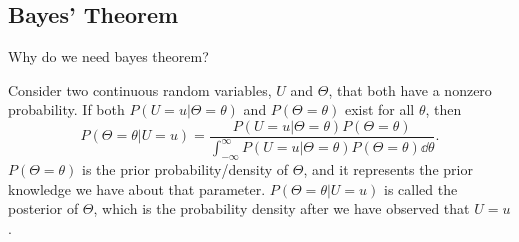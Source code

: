 \subsection{Bayes' Theorem}
Why do we need bayes theorem?

\begin{comment}
Consider two events, $A$ and $B$. We can find the probability of $A$ given event $B$ by the use of the probability of event $B$ given $A$ and the probabilities of the events $A$ and $B$ separately \citep{statinf}. Hence,
\begin{equation}
\label{bayesrule}
    P(A|B)=\frac{P(B|A)P(A)}{P(B)}.
\end{equation}
This is called Bayes' Rule. 

Or should I write about the continous version? Could I for example write: 
\end{comment}

\begin{comment}
From \citet{schay2016introduction}, we have a version of Bayes' theorem for continuous variables which is stated as 
\begin{theorem}[Bayes' Theorem]
\label{bayestheorem}
For a continuous random variable Y and any event A with nonzero probability, if $P(A|Y=y)$ and $f_Y$ exist for all $y$, then
\begin{equation}
    \label{bayestheorem_eq}
    f_{Y|A}(y) = \frac{P(A|Y=y)f_Y(y)}{\int_{-\infty}^{\infty}P(A|Y=y) f_Y(y) dy}.
\end{equation}
Here $f_Y$is called the prior density of $Y$, and $f_{Y|A}$ its posterior density, referring to the fact that these are the densities of $Y$ before and after the observation of $A$. 
\end{theorem}

From \eqref{lawoftotprob} we see that the denominator is the probability of event $A$, \begin{equation*}
    \int_{-\infty}^{\infty}P(A|Y=y) f_Y(y) = P(A),
\end{equation*}
such that Bayes' theorem can be stated as
\begin{equation}
    \label{bayestheorem_eq2}
    f_{Y|A}(y) = \frac{P(A|Y=y)f_Y(y)}{P(A)}.
\end{equation}


Or:
\end{comment}


\begin{theorem}
\label{bayestheorem}
Consider two continuous random variables, $U$ and $\Theta$, that both have a nonzero probability. If both $P(U=u|\Theta=\theta)$ and $P(\Theta=\theta)$ exist for all $\theta$, then \citep{schay2016introduction}
\begin{equation}
    \label{bayesrule}
    P(\Theta=\theta|U=u) = \frac{P(U=u|\Theta=\theta)P(\Theta=\theta)}{\int_{-\infty}^{\infty} P(U=u|\Theta=\theta)P(\Theta=\theta) \dd \theta}.
\end{equation}
$P(\Theta=\theta)$ is the prior probability/density of $\Theta$, and it represents the prior knowledge we have about that parameter. $P(\Theta=\theta|U=u)$ is called the posterior of $\Theta$, which is the probability density after we have observed that $U=u$. 
\end{theorem}


